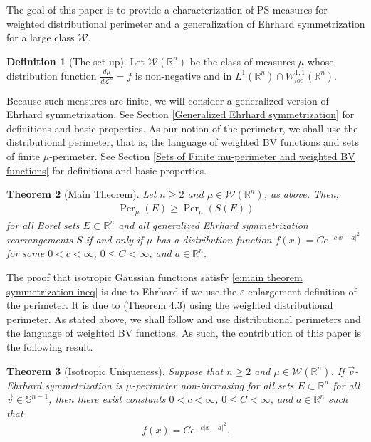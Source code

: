 \documentclass[12pt]{amsart}
\numberwithin{equation}{section}
\theoremstyle{plain}
\newtheorem{theorem}{Theorem}[section]
\theoremstyle{definition}
\newtheorem{definition}[theorem]{Definition}
\begin{document}
The goal of this paper is to provide a characterization of PS measures for weighted distributional perimeter and a generalization of Ehrhard symmetrization for a large class $\mathscr{W}$.

\begin{definition}[The set up]
Let $\mathscr{W}(\mathbb{R}^n)$ be the class of measures $\mu$ whose distribution function $\frac{d\mu}{d\mathscr{L}^n} = f$ is non-negative and in $L^1(\mathbb{R}^n)\cap W^{1,1}_{loc}(\mathbb{R}^n)$.

Because such measures are finite, we will consider a generalized version of Ehrhard symmetrization.  See Section \ref{Generalized Ehrhard symmetrization} for definitions and basic properties. As our notion of the perimeter, we shall use the distributional perimeter, that is, the language of weighted BV functions and sets of finite $\mu$-perimeter. See Section \ref{Sets of Finite mu-perimeter and weighted BV functions} for definitions and basic properties.
\end{definition}

\begin{theorem}[Main Theorem]\label{Main Theorem}
Let $n \ge 2$ and $\mu \in \mathscr{W}(\mathbb{R}^n)$, as above.  Then, 
\begin{align} \label{e:main theorem symmetrization ineq}
\operatorname{Per}_{\mu}(E) \ge \operatorname{Per}_{\mu}(S(E))
\end{align}
for all Borel sets $E \subset \mathbb{R}^n$ and all generalized Ehrhard symmetrization rearrangements $S$ if and only if $\mu$ has a distribution function $f(x) = Ce^{-c|x-a|^2}$ for some $0<c<\infty$, $0 \le C <\infty$, and $a \in \mathbb{R}^n$.  
\end{theorem}

The proof that isotropic Gaussian functions satisfy \eqref{e:main theorem symmetrization ineq} is due to Ehrhard \cite{Ehrhard82} if we use the $\varepsilon$-enlargement definition of the perimeter. It is due to \cite{CianchiFuscoMaggiPratelli11} (Theorem 4.3) using the weighted distributional perimeter. As stated above, we shall follow \cite{CianchiFuscoMaggiPratelli11} and use distributional perimeters and the language of weighted BV functions. As such, the contribution of this paper is the following result.

\begin{theorem}[Isotropic Uniqueness]\label{t:main theorem 2}
    Suppose that $n \ge 2$ and $\mu \in \mathscr{W}(\mathbb{R}^n)$.  If $\vec{v}$-Ehrhard symmetrization is $\mu$-perimeter non-increasing for all sets $E \subset \mathbb{R}^n$ for all $\vec{v} \in \mathbb{S}^{n-1}$, then there exist constants $0<c<\infty$, $0\le C<\infty$, and $a \in \mathbb{R}^n$ such that
    \begin{align*}
        f(x) = Ce^{-c|x-a|^2}.
    \end{align*}
\end{theorem}
\end{document}
